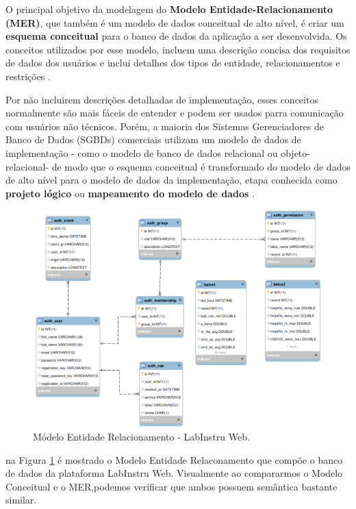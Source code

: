 O principal objetivo da modelagem do \textbf{Modelo Entidade-Relacionamento (MER)}, que também é um modelo de dados conceitual de alto nível, é criar um \textbf{esquema conceitual} para o banco de dados da aplicação a ser desenvolvida. Os conceitos utilizados por esse modelo, incluem uma descrição concisa dos requisitos de dados dos usuários e inclui detalhes dos tipos de entidade, relacionamentos e restrições \cite{Navathe:Livro}.

Por não incluirem descrições detalhadas de implementação, esses conceitos normalmente são mais fáceis de entender e podem ser usados parra comunicação com usuários não técnicos. Porém, a maioria dos Sistemas Gerenciadores de Banco de Dados (SGBDs) comerciais utilizam um modelo de dados de implementação - como o modelo de banco de dados relacional ou objeto-relacional- de modo que o esquema conceitual é transformado do modelo de dados de alto nível para o modelo de dados da implementação, etapa conhecida como \textbf{projeto lógico} ou \textbf{mapeamento do modelo de dados} \cite{Navathe:Livro}.

\begin{figure}[H]
	\centering
	\includegraphics[scale=1.0]{img/mer.png}
	\caption{Módelo Entidade Relacionamento - LabInstru Web.}
	\label{fig:mer}
\end{figure}

na Figura \ref{fig:mer} é mostrado o Modelo Entidade Relaconamento que compõe o banco de dados da plataforma LabInstru Web. Visualmente ao compararmos o Modelo Conceitual e o MER,podemos verificar que ambos possuem semântica bastante similar.
